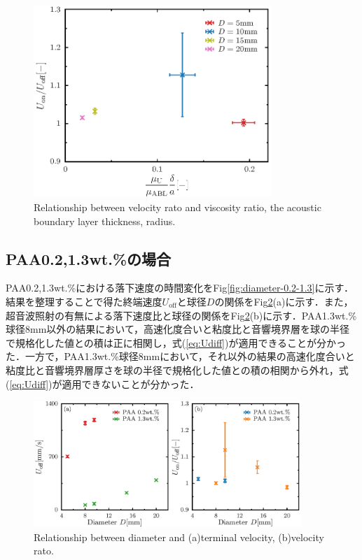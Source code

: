 \begin{figure}[ht]
    \centering
    \includegraphics[width=0.8\textwidth]{./5-Results/diameter-0.5/mu_Udiff.eps}
    \caption{Relationship between velocity rato and viscosity ratio, the acoustic boundary layer thickness, radius.}
    \label{fig:muUdiff0.5}
\end{figure}

\clearpage

\subsection{PAA0.2,1.3wt.\%の場合}
PAA0.2,1.3wt.\%における落下速度の時間変化をFig\ref{fig:diameter-0.2-1.3}に示す．結果を整理することで得た終端速度$U_\text{off}$と球径$D$の関係をFig\ref{fig:diaUT0.2-1.3}(a)に示す．また，超音波照射の有無による落下速度比と球径の関係をFig\ref{fig:diaUT0.2-1.3}(b)に示す．PAA1.3wt.\%球径8mm以外の結果において，高速化度合いと粘度比と音響境界層を球の半径で規格化した値との積は正に相関し，式(\ref{eq:Udiff})が適用できることが分かった．一方で，PAA1.3wt.\%球径8mmにおいて，それ以外の結果の高速化度合いと粘度比と音響境界層厚さを球の半径で規格化した値との積の相関から外れ，式(\ref{eq:Udiff})が適用できないことが分かった．

\begin{figure}[ht]
    \centering
    \includegraphics[width=0.9\textwidth]{./5-Results/diameter-0.2-1.3/diaUT_Udiff.eps}
    \caption{Relationship between diameter and (a)terminal velocity, (b)velocity rato.}
    \label{fig:diaUT0.2-1.3}
\end{figure}

